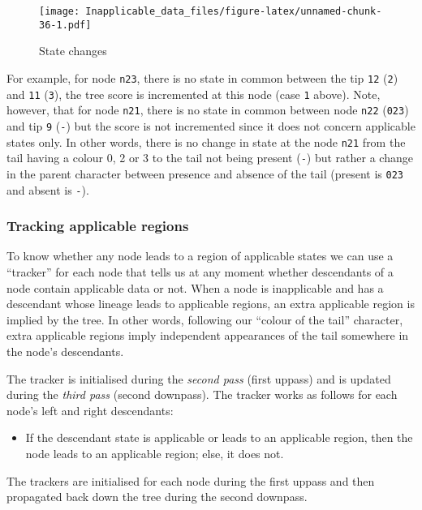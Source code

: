 \documentclass[]{book}
\providecommand{\tightlist}{%
  \setlength{\itemsep}{0pt}\setlength{\parskip}{0pt}}
\theoremstyle{definition}
\theoremstyle{definition}
\theoremstyle{definition}
\theoremstyle{remark}
\begin{document}
\begin{figure}
\centering
\texttt{[image: Inapplicable\_data\_files/figure-latex/unnamed-chunk-36-1.pdf]}
\caption{\label{fig:unnamed-chunk-36}State changes}
\end{figure}

For example, for node \texttt{n23}, there is no state in common between
the tip \texttt{12} (\texttt{2}) and \texttt{11} (\texttt{3}), the tree
score is incremented at this node (case \texttt{1} above). Note,
however, that for node \texttt{n21}, there is no state in common between
node \texttt{n22} (\texttt{023}) and tip \texttt{9} (\texttt{-}) but the
score is not incremented since it does not concern applicable states
only. In other words, there is no change in state at the node
\texttt{n21} from the tail having a colour 0, 2 or 3 to the tail not
being present (\texttt{-}) but rather a change in the parent character
between presence and absence of the tail (present is \texttt{023} and
absent is \texttt{-}).

\hypertarget{tracking-applicable-regions}{%
\subsubsection{Tracking applicable
regions}\label{tracking-applicable-regions}}

To know whether any node leads to a region of applicable states we can
use a ``tracker'' for each node that tells us at any moment whether
descendants of a node contain applicable data or not. When a node is
inapplicable and has a descendant whose lineage leads to applicable
regions, an extra applicable region is implied by the tree. In other
words, following our ``colour of the tail'' character, extra applicable
regions imply independent appearances of the tail somewhere in the
node's descendants.

The tracker is initialised during the \emph{second pass} (first uppass)
and is updated during the \emph{third pass} (second downpass). The
tracker works as follows for each node's left and right descendants:

\begin{itemize}
\tightlist
\item
  If the descendant state is applicable or leads to an applicable
  region, then the node leads to an applicable region; else, it does
  not.
\end{itemize}

The trackers are initialised for each node during the first uppass and
then propagated back down the tree during the second downpass.
\end{document}
